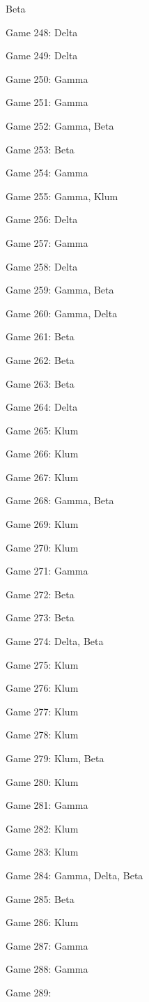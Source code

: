 \documentclass{article}
\begin{document}
\begin{multicols}{3}
\begin{compactitem}
Beta
\item Game 248:
Delta
\item Game 249:
Delta
\item Game 250:
Gamma
\item Game 251:
Gamma
\item Game 252:
Gamma, Beta
\item Game 253:
Beta
\item Game 254:
Gamma
\item Game 255:
Gamma, Klum
\item Game 256:
Delta
\item Game 257:
Gamma
\item Game 258:
Delta
\item Game 259:
Gamma, Beta
\item Game 260:
Gamma, Delta
\item Game 261:
Beta
\item Game 262:
Beta
\item Game 263:
Beta
\item Game 264:
Delta
\item Game 265:
Klum
\item Game 266:
Klum
\item Game 267:
Klum
\item Game 268:
Gamma, Beta
\item Game 269:
Klum
\item Game 270:
Klum
\item Game 271:
Gamma
\item Game 272:
Beta
\item Game 273:
Beta
\item Game 274:
Delta, Beta
\item Game 275:
Klum
\item Game 276:
Klum
\item Game 277:
Klum
\item Game 278:
Klum
\item Game 279:
Klum, Beta
\item Game 280:
Klum
\item Game 281:
Gamma
\item Game 282:
Klum
\item Game 283:
Klum
\item Game 284:
Gamma, Delta, Beta
\item Game 285:
Beta
\item Game 286:
Klum
\item Game 287:
Gamma
\item Game 288:
Gamma
\item Game 289:

\end{compactitem}
\end{multicols}
\end{document}
